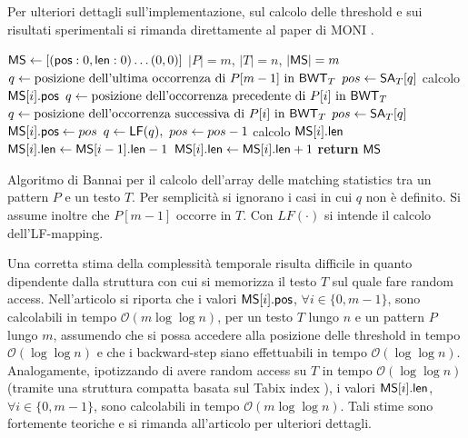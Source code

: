 Per ulteriori dettagli sull'implementazione, sul calcolo delle
threshold e sui risultati sperimentali si rimanda direttamente al paper
di MONI \cite{moni}.
\begin{algorithm}
  \footnotesize
  \begin{algorithmic}[1]
    \State $\mbox{\rm {\sf MS}}\gets[(\mbox{\rm {\sf pos}} : 0, \mbox{\rm {\sf len}} : 0) \ldots (0, 0)]$
    \Comment $|P| = m$, $|T| = n$, $|\mbox{\rm {\sf MS}}| = m$
    \State $q\gets\mbox{posizione dell'ultima occorrenza di }P[m-1] \mbox{ in }
    \mbox{\rm {\sf BWT}}_T$ 
    \State $pos \gets \mbox{\rm {\sf SA}}_T[q]$
    \Comment calcolo $\mbox{\rm {\sf MS}}[i].\mbox{\rm {\sf pos}}$
    \State $q\gets\mbox{posizione dell'occorrenza precedente di }P[i] \mbox{ in
    } \mbox{\rm {\sf BWT}}_T$
    \Else
    \State $q\gets\mbox{posizione dell'occorrenza successiva di }P[i] \mbox{ in
    } \mbox{\rm {\sf BWT}}_T$
    \EndIf
    \State $pos\gets \mbox{\rm {\sf SA}}_T[q]$
    \EndIf
    \State $\mbox{\rm {\sf MS}}[i].\mbox{\rm {\sf pos}} \gets pos$
    \State $q\gets \mbox{\rm {\sf LF}}(q),\,\,pos\gets pos-1$
    \EndFor
    \Comment calcolo $\mbox{\rm {\sf MS}}[i].\mbox{\rm {\sf len}}$
    \State $\mbox{\rm {\sf MS}}[i].\mbox{\rm {\sf len}}\gets \mbox{\rm {\sf MS}}[i-1].\mbox{\rm {\sf len}}-1$
    \State  $\mbox{\rm {\sf MS}}[i].\mbox{\rm {\sf len}}\gets \mbox{\rm {\sf MS}}[i].\mbox{\rm {\sf len}}+1$
    \EndWhile
    \EndFor
    \State \textbf{return} $\mbox{\rm {\sf MS}}$
    \EndFunction
  \end{algorithmic}
  \caption{Algoritmo di Bannai per il calcolo dell'array delle matching
  statistics tra un 
  pattern $P$ e un testo $T$. Per
  semplicità si ignorano i casi in cui $q$ non è definito. Si
  assume inoltre che $P[m-1]$ occorre in $T$. Con $LF(\cdot)$ si intende il
  calcolo dell'LF-mapping.}
  \label{algo:bannai}
\end{algorithm}
Una corretta stima della complessità temporale risulta difficile in quanto 
dipendente dalla struttura con cui si memorizza il testo $T$ sul quale fare 
random access. Nell'articolo si riporta che i valori
$\mbox{\rm {\sf MS}}[i].\mbox{\rm {\sf pos}}$, $\forall i\in\{0,m-1\}$, sono calcolabili in tempo 
$\mathcal{O}(m\log\log n)$, per un testo $T$ lungo
 $n$ e un pattern $P$ lungo $m$, assumendo che si possa accedere
alla posizione delle threshold in tempo $\mathcal{O}(\log\log n)$ e che 
i backward-step siano effettuabili in tempo $\mathcal{O}(\log\log n)$.
Analogamente, ipotizzando di avere random access su $T$ in tempo 
$\mathcal{O}(\log\log n)$ (tramite una struttura compatta
basata sul Tabix index \cite{tabix}), i valori
$\mbox{\rm {\sf MS}}[i].\mbox{\rm {\sf len}}$, $\forall i\in\{0,m-1\}$, sono calcolabili in tempo 
$\mathcal{O}(m\log\log n)$. Tali stime sono fortemente teoriche e
si rimanda all'articolo per ulteriori dettagli.

